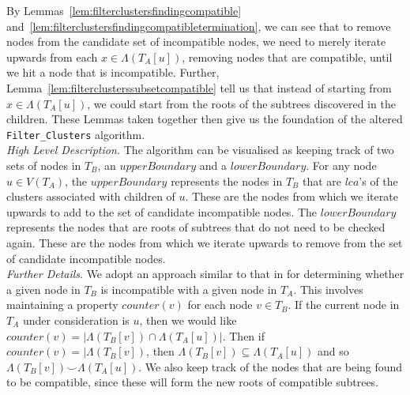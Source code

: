 \documentclass{article}
\newcommand{\compatible}{\smile}
\newcommand{\leafset}{\Lambda}
\begin{document}
    By Lemmas~\ref{lem:filterclustersfindingcompatible} and~\ref{lem:filterclustersfindingcompatibletermination}, we can see that to remove nodes from the candidate set of incompatible nodes, we need to merely iterate upwards from each $x \in \leafset(T_A[u])$, removing nodes that are compatible, until we hit a node that is incompatible. Further, Lemma~\ref{lem:filterclusterssubsetcompatible} tell us that instead of starting from $x \in \leafset(T_A[u])$, we could start from the roots of the subtrees discovered in the children. These Lemmas taken together then give us the foundation of the altered \texttt{Filter\_Clusters} algorithm.\\

    \textit{High Level Description.} The algorithm can be visualised as keeping track of two sets of nodes in $T_B$, an $upperBoundary$ and a $lowerBoundary$. For any node $u \in V(T_A)$, the $upperBoundary$ represents the nodes in $T_B$ that are $lca$'s of the clusters associated with children of $u$. These are the nodes from which we iterate upwards to add to the set of candidate incompatible nodes. The $lowerBoundary$ represents the nodes that are roots of subtrees that do not need to be checked again. These are the nodes from which we iterate upwards to remove from the set of candidate incompatible nodes.\\

    \textit{Further Details}. We adopt an approach similar to that in \cite{jansson2018algorithms} for determining whether a given node in $T_B$ is incompatible with a given node in $T_A$. This involves maintaining a property $counter(v)$ for each node $v \in T_B$. If the current node in $T_A$ under consideration is $u$, then we would like $counter(v) = |\leafset(T_B[v]) \cap \leafset(T_A[u])|$. Then if $counter(v) = |\leafset(T_B[v])$, then $\leafset(T_B[v]) \subseteq \leafset(T_A[u])$ and so $\leafset(T_B[v]) \compatible \leafset(T_A[u])$. We also keep track of the nodes that are being found to be compatible, since these will form the new roots of compatible subtrees.
\end{document}
